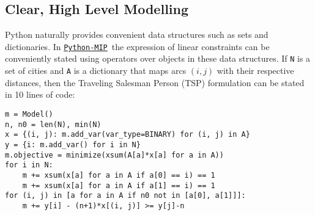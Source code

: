 \documentclass{article}
\def\PythonMIP{\href{https://github.com/coin-or/python-mip}{\texttt{Python-MIP}}}
\begin{document}
\subsection{Clear, High Level Modelling}
Python naturally provides convenient data structures such as sets and dictionaries. In \PythonMIP\ the expression of linear constraints can be conveniently stated using operators over objects in these data structures. If \texttt{N} is a set of cities and \texttt{A} is a dictionary that maps arcs $(i,j)$ with their respective distances, then the Traveling Salesman Person (TSP) formulation\cite{Miller1960} can be stated in 10 lines of code:

\begin{verbatim}
m = Model()
n, n0 = len(N), min(N)
x = {(i, j): m.add_var(var_type=BINARY) for (i, j) in A}
y = {i: m.add_var() for i in N}
m.objective = minimize(xsum(A[a]*x[a] for a in A))
for i in N:
    m += xsum(x[a] for a in A if a[0] == i) == 1
    m += xsum(x[a] for a in A if a[1] == i) == 1
for (i, j) in [a for a in A if n0 not in [a[0], a[1]]]:
    m += y[i] - (n+1)*x[(i, j)] >= y[j]-n
\end{verbatim}
\end{document}
